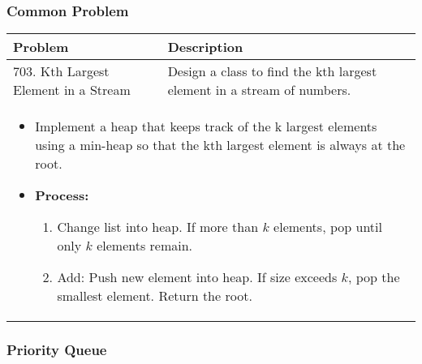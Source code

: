 \subsubsection{Common Problem}
\begin{summary}
    \begin{center}
        \begin{tabular}{ll}
            \toprule
            \textbf{Problem} & \textbf{Description} \\
            \midrule
            703. Kth Largest Element in a Stream & Design a class to find the kth largest element in a stream of numbers. \\
            \multicolumn{2}{p{\linewidth}}{
                    \begin{itemize}
                        \item Implement a heap that keeps track of the k largest elements using a min-heap so that the kth largest element is always at the root. 
                        \item \textbf{Process:}
                        \begin{enumerate}
                            \item Change list into heap. If more than $k$ elements, pop until only $k$ elements remain.
                            \item Add: Push new element into heap. If size exceeds $k$, pop the smallest element. Return the root.
                        \end{enumerate}
                    \end{itemize}
                } \\
            \midrule
        \end{tabular}
    \end{center}
\end{summary}


\subsubsection{Priority Queue}
\begin{algo}
    
\end{algo}